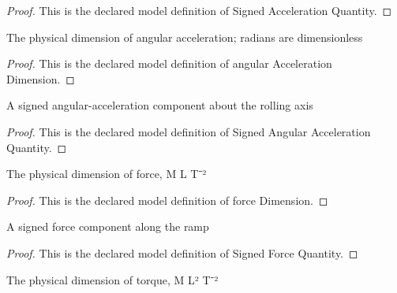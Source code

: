 \begin{proof}
  This is the declared model definition of Signed Acceleration Quantity.
\end{proof}
\begin{definition}
  \label{def:physics:phyx-mini-0825:phyxminiproblems-problemphyxmini0825-angularaccelerationdimension}
  The physical dimension of angular acceleration; radians are dimensionless
\end{definition}
\begin{proof}
  This is the declared model definition of angular Acceleration Dimension.
\end{proof}
\begin{definition}
  \label{def:physics:phyx-mini-0825:phyxminiproblems-problemphyxmini0825-signedangularaccelerationquantity}
  A signed angular-acceleration component about the rolling axis
\end{definition}
\begin{proof}
  This is the declared model definition of Signed Angular Acceleration Quantity.
\end{proof}
\begin{definition}
  \label{def:physics:phyx-mini-0825:phyxminiproblems-problemphyxmini0825-forcedimension}
  The physical dimension of force, M L T⁻²
\end{definition}
\begin{proof}
  This is the declared model definition of force Dimension.
\end{proof}
\begin{definition}
  \label{def:physics:phyx-mini-0825:phyxminiproblems-problemphyxmini0825-signedforcequantity}
  A signed force component along the ramp
\end{definition}
\begin{proof}
  This is the declared model definition of Signed Force Quantity.
\end{proof}
\begin{definition}
  \label{def:physics:phyx-mini-0825:phyxminiproblems-problemphyxmini0825-torquedimension}
  The physical dimension of torque, M L² T⁻²
\end{definition}
